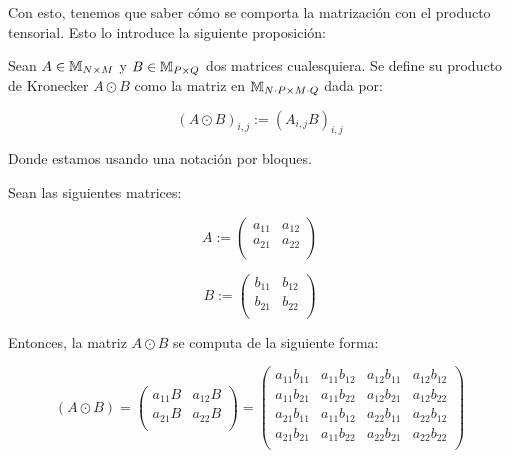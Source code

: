 Con esto, tenemos que saber cómo se comporta la matrización con el producto tensorial. Esto lo introduce la siguiente proposición:

\begin{definicion}

    Sean $A \in \mathbb{M}_{N \times M}$ y  $B \in \mathbb{M}_{P \times Q}$ dos matrices cualesquiera. Se define su producto de Kronecker $A \odot B$ como la matriz en $\mathbb{M}_{N \cdot P \times M \cdot Q}$ dada por:

    \begin{equation}
        (A \odot B)_{i,j} := (A_{i, j} B)_{i, j}
    \end{equation}

    Donde estamos usando una notación por bloques.
\end{definicion}

\begin{ejemplo}

Sean las siguientes matrices:

    \begin{equation}
        A := \begin{pmatrix}
            a_{11} & a_{12} \\
            a_{21} & a_{22} \\
        \end{pmatrix}
    \end{equation}

    \begin{equation}
        B := \begin{pmatrix}
            b_{11} & b_{12} \\
            b_{21} & b_{22} \\
        \end{pmatrix}
    \end{equation}

    Entonces, la matriz $A \odot B$ se computa de la siguiente forma:

    \begin{equation}
        (A \odot B) = \begin{pmatrix}
            a_{11}B & a_{12}B \\
            a_{21}B & a_{22}B \\
        \end{pmatrix} =
        \begin{pmatrix}
            a_{11} b_{11} & a_{11} b_{12} & a_{12} b_{11} & a_{12} b_{12} \\
            a_{11} b_{21} & a_{11} b_{22} & a_{12} b_{21} & a_{12} b_{22} \\
            a_{21} b_{11} & a_{11} b_{12} & a_{22} b_{11} & a_{22} b_{12} \\
            a_{21} b_{21} & a_{11} b_{22} & a_{22} b_{21} & a_{22} b_{22} \\
        \end{pmatrix}
    \end{equation}

\end{ejemplo}


